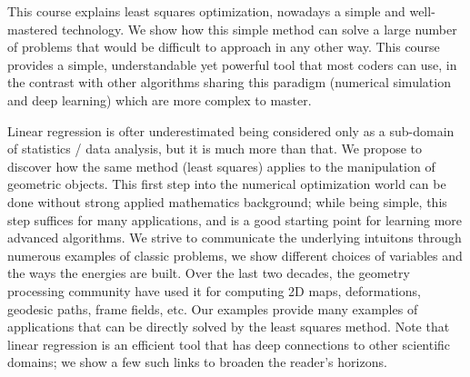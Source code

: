 \documentclass[notitlepage,oneside]{book}
\begin{document}
This course explains least squares optimization, nowadays a simple and well-mastered technology.
We show how this simple method can solve a large number of problems that would be difficult to approach in any other way.
This course provides a simple, understandable yet powerful tool that most coders can use,
in the contrast with other algorithms sharing this paradigm (numerical simulation and deep learning) which are more complex to master.

Linear regression is ofter underestimated being considered only as a sub-domain of statistics / data analysis, but it is much more than that.
We propose to discover how the same method (least squares) applies to the manipulation of geometric objects.
This first step into the numerical optimization world can be done without strong applied mathematics background;
while being simple, this step suffices for many applications, and is a good starting point for learning more advanced algorithms.
We strive to communicate the underlying intuitons through numerous examples of classic problems, we show different choices of variables and the ways the energies are built.
Over the last two decades, the geometry processing community have used it for computing 2D maps, deformations, geodesic paths, frame fields, etc.
Our examples provide many examples of applications that can be directly solved by the least squares method.
Note that linear regression is an efficient tool that has deep connections to other scientific domains;
we show a few such links to broaden the reader's horizons.

\iffalse
\end{document}
